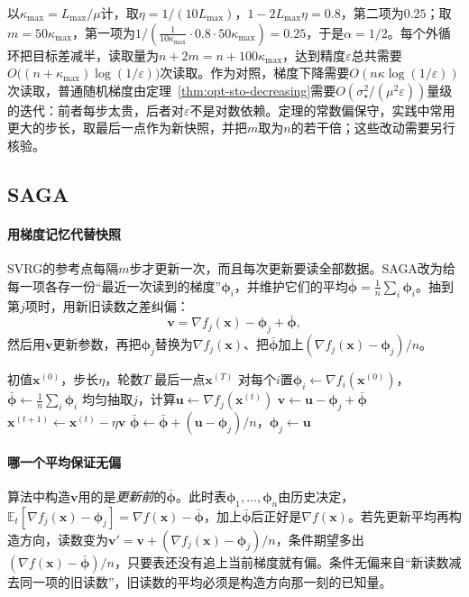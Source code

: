 以$\kappa_{\max}=L_{\max}/\mu$计，取$\eta=1/(10L_{\max})$，$1-2L_{\max}\eta=0.8$，第二项为$0.25$；取$m=50\kappa_{\max}$，第一项为$1/(\tfrac1{10\kappa_{\max}}\cdot0.8\cdot50\kappa_{\max})=0.25$，于是$\alpha=1/2$。每个外循环把目标差减半，读取量为$n+2m=n+100\kappa_{\max}$，达到精度$\varepsilon$总共需要$O\bigl((n+\kappa_{\max})\log(1/\varepsilon)\bigr)$次读取。作为对照，梯度下降需要$O(n\kappa\log(1/\varepsilon))$次读取，普通随机梯度由定理~\ref{thm:opt-sto-decreasing}需要$O(\sigma_\star^2/(\mu^2\varepsilon))$量级的迭代：前者每步太贵，后者对$\varepsilon$不是对数依赖。定理的常数偏保守，实践中常用更大的步长，取最后一点作为新快照，并把$m$取为$n$的若干倍；这些改动需要另行核验。

\subsection{SAGA}
\label{sec:opt-sto-saga}

\paragraph{用梯度记忆代替快照}
SVRG的参考点每隔$m$步才更新一次，而且每次更新要读全部数据。SAGA改为给每一项各存一份“最近一次读到的梯度”$\bm\phi_i$，并维护它们的平均$\bar{\bm\phi}=\frac1n\sum_i\bm\phi_i$。抽到第$j$项时，用新旧读数之差纠偏：
\begin{equation}
\label{eq:opt-sto-saga}
  \bm v=\nabla f_j(\bm x)-\bm\phi_j+\bar{\bm\phi},
\end{equation}
然后用$\bm v$更新参数，再把$\bm\phi_j$替换为$\nabla f_j(\bm x)$、把$\bar{\bm\phi}$加上$(\nabla f_j(\bm x)-\bm\phi_j)/n$。

\begin{algorithm}[SAGA]
\label{alg:opt-sto-saga}
\begin{algorithmic}[1]
\Require 初值$\bm x^{(0)}$，步长$\eta$，轮数$T$
\Ensure 最后一点$\bm x^{(T)}$
\State 对每个$i$置$\bm\phi_i\gets\nabla f_i(\bm x^{(0)})$，$\bar{\bm\phi}\gets\frac1n\sum_i\bm\phi_i$ 
  \State 均匀抽取$j$，计算$\bm u\gets\nabla f_j(\bm x^{(t)})$
  \State $\bm v\gets\bm u-\bm\phi_j+\bar{\bm\phi}$ 
  \State $\bm x^{(t+1)}\gets\bm x^{(t)}-\eta\bm v$
  \State $\bar{\bm\phi}\gets\bar{\bm\phi}+(\bm u-\bm\phi_j)/n$，$\bm\phi_j\gets\bm u$
\EndFor
\end{algorithmic}
\end{algorithm}

\paragraph{哪一个平均保证无偏}
算法中构造$\bm v$用的是\emph{更新前}的$\bar{\bm\phi}$。此时表$\bm\phi_1,\dots,\bm\phi_n$由历史决定，$\mathbb E_t[\nabla f_j(\bm x)-\bm\phi_j]=\nabla f(\bm x)-\bar{\bm\phi}$，加上$\bar{\bm\phi}$后正好是$\nabla f(\bm x)$。若先更新平均再构造方向，读数变为$\bm v'=\bm v+(\nabla f_j(\bm x)-\bm\phi_j)/n$，条件期望多出$(\nabla f(\bm x)-\bar{\bm\phi})/n$，只要表还没有追上当前梯度就有偏。条件无偏来自“新读数减去同一项的旧读数”，旧读数的平均必须是构造方向那一刻的已知量。

